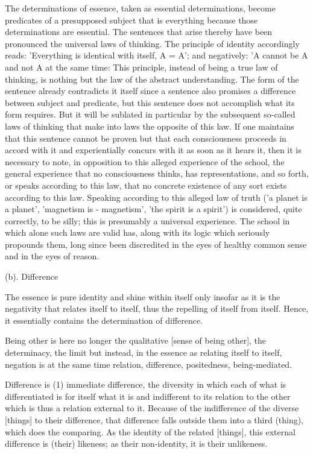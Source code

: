     The determinations of essence,
    taken as essential determinations,
    become predicates of a presupposed subject
    that is everything because
    those determinations are essential.
    The sentences that arise thereby have been pronounced
    the universal laws of thinking.
    The principle of identity accordingly reads:
    'Everything is identical with itself, A = A';
    and negatively:
    'A cannot be A and not A at the same time:
    This principle, instead of being a true law of thinking,
    is nothing but the law of the abstract understanding.
    The form of the sentence already contradicts it itself
    since a sentence also promises a difference between subject and predicate,
    but this sentence does not accomplish what its form requires.
    But it will be sublated in particular by the subsequent so-called
    laws of thinking that make into laws the opposite of this law.
    If one maintains that this sentence cannot be proven but that
    each consciousness proceeds in accord with it and
    experientially concurs with it as soon as it hears it,
    then it is necessary to note,
    in opposition to this alleged experience of the school,
    the general experience that no consciousness thinks,
    has representations, and so forth, or speaks according to this law,
    that no concrete existence of any sort exists according to this law.
    Speaking according to this alleged law of truth
    ('a planet is a planet', 'magnetism is - magnetism', 'the spirit is a spirit')
    is considered, quite correctly, to be silly;
    this is presumably a universal experience.
    The school in which alone such laws are valid has,
    along with its logic which seriously propounds them,
    long since been discredited in the eyes of
    healthy common sense and in the eyes of reason.

(b). Difference

The essence is pure identity and shine within itself only insofar
as it is the negativity that relates itself to itself,
thus the repelling of itself from itself.
Hence, it essentially contains the determination of difference.

    Being other is here no longer the qualitative [sense of being other],
    the determinacy, the limit but instead, in the essence as
    relating itself to itself, negation is at the same time relation,
    difference, positedness, being-mediated.

Difference is (1) immediate difference,
the diversity in which each of what is differentiated is
for itself what it is and indifferent to its relation to the other
which is thus a relation external to it.
Because of the indifference of the diverse [things] to their difference,
that difference falls outside them into a third (thing), which does the comparing.
As the identity of the related [things],
this external difference is (their) likeness;
as their non-identity, it is their unlikeness.

